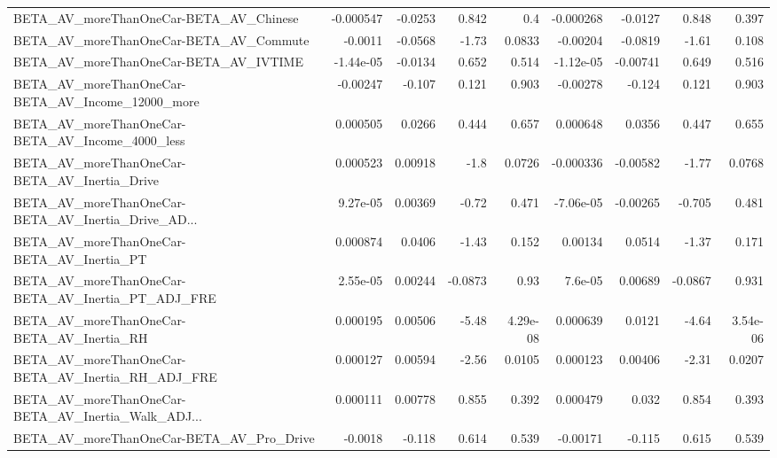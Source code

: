 \begin{tabular}{lrrrrrrrr}
BETA\_AV\_moreThanOneCar-BETA\_AV\_Chinese             &   -0.000547 &      -0.0253 &    0.842 &      0.4 &  -0.000268 &     -0.0127 &        0.848 &         0.397 \\
BETA\_AV\_moreThanOneCar-BETA\_AV\_Commute             &     -0.0011 &      -0.0568 &    -1.73 &   0.0833 &   -0.00204 &     -0.0819 &        -1.61 &         0.108 \\
BETA\_AV\_moreThanOneCar-BETA\_AV\_IVTIME              &   -1.44e-05 &      -0.0134 &    0.652 &    0.514 &  -1.12e-05 &    -0.00741 &        0.649 &         0.516 \\
BETA\_AV\_moreThanOneCar-BETA\_AV\_Income\_12000\_more   &    -0.00247 &       -0.107 &    0.121 &    0.903 &   -0.00278 &      -0.124 &        0.121 &         0.903 \\
BETA\_AV\_moreThanOneCar-BETA\_AV\_Income\_4000\_less    &    0.000505 &       0.0266 &    0.444 &    0.657 &   0.000648 &      0.0356 &        0.447 &         0.655 \\
BETA\_AV\_moreThanOneCar-BETA\_AV\_Inertia\_Drive       &    0.000523 &      0.00918 &     -1.8 &   0.0726 &  -0.000336 &    -0.00582 &        -1.77 &        0.0768 \\
BETA\_AV\_moreThanOneCar-BETA\_AV\_Inertia\_Drive\_AD... &    9.27e-05 &      0.00369 &    -0.72 &    0.471 &  -7.06e-05 &    -0.00265 &       -0.705 &         0.481 \\
BETA\_AV\_moreThanOneCar-BETA\_AV\_Inertia\_PT          &    0.000874 &       0.0406 &    -1.43 &    0.152 &    0.00134 &      0.0514 &        -1.37 &         0.171 \\
BETA\_AV\_moreThanOneCar-BETA\_AV\_Inertia\_PT\_ADJ\_FRE  &    2.55e-05 &      0.00244 &  -0.0873 &     0.93 &    7.6e-05 &     0.00689 &      -0.0867 &         0.931 \\
BETA\_AV\_moreThanOneCar-BETA\_AV\_Inertia\_RH          &    0.000195 &      0.00506 &    -5.48 & 4.29e-08 &   0.000639 &      0.0121 &        -4.64 &      3.54e-06 \\
BETA\_AV\_moreThanOneCar-BETA\_AV\_Inertia\_RH\_ADJ\_FRE  &    0.000127 &      0.00594 &    -2.56 &   0.0105 &   0.000123 &     0.00406 &        -2.31 &        0.0207 \\
BETA\_AV\_moreThanOneCar-BETA\_AV\_Inertia\_Walk\_ADJ... &    0.000111 &      0.00778 &    0.855 &    0.392 &   0.000479 &       0.032 &        0.854 &         0.393 \\
BETA\_AV\_moreThanOneCar-BETA\_AV\_Pro\_Drive           &     -0.0018 &       -0.118 &    0.614 &    0.539 &   -0.00171 &      -0.115 &        0.615 &         0.539 \\

\end{tabular}
